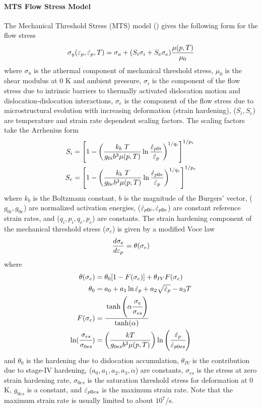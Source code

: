   \paragraph{MTS Flow Stress Model}
  The Mechanical Threshold Stress (MTS) model 
  (\cite{Follans88,Goto00a,Kocks01})  
  gives the following form for the flow stress
  \begin{equation}
    \sigma_y(\Ep,\Epdot{},T) = 
      \sigma_a + (S_i \sigma_i + S_e \sigma_e)\frac{\mu(p,T)}{\mu_0} 
  \end{equation}
  where $\sigma_a$ is the athermal component of mechanical threshold stress,
  $\mu_0$ is the shear modulus at 0 K and ambient pressure, 
  $\sigma_i$ is the component of the flow stress due to intrinsic barriers 
  to thermally activated dislocation motion and dislocation-dislocation 
  interactions, $\sigma_e$ is the component of the flow stress due to 
  microstructural evolution with increasing deformation (strain hardening), 
  ($S_i, S_e$) are temperature and strain rate dependent scaling factors.  The
  scaling factors take the Arrhenius form
  \begin{align}
    S_i & = \left[1 - \left(\frac{k_b~T}{g_{0i}b^3\mu(p,T)}
    \ln\frac{\Epdot{0i}}{\Epdot{}}\right)^{1/q_i}
    \right]^{1/p_i} \\
    S_e & = \left[1 - \left(\frac{k_b~T}{g_{0e}b^3\mu(p,T)}
    \ln\frac{\Epdot{0e}}{\Epdot{}}\right)^{1/q_e}
    \right]^{1/p_e}
  \end{align}
  where $k_b$ is the Boltzmann constant, $b$ is the magnitude of the Burgers' 
  vector, ($g_{0i}, g_{0e}$) are normalized activation energies, 
  ($\Epdot{0i}, \Epdot{0e}$) are constant reference strain rates, and
  ($q_i, p_i, q_e, p_e$) are constants.  The strain hardening component
  of the mechanical threshold stress ($\sigma_e$) is given by a
  modified Voce law
  \begin{equation}\label{eq:MTSsige}
    \frac{d\sigma_e}{d\Ep} = \theta(\sigma_e)
  \end{equation}
  where
  \begin{align}
    \theta(\sigma_e) & = 
       \theta_0 [ 1 - F(\sigma_e)] + \theta_{IV} F(\sigma_e) \\
    \theta_0 & = a_0 + a_1 \ln \Epdot{} + a_2 \sqrt{\Epdot{}} - a_3 T \\
    F(\sigma_e) & = 
      \cfrac{\tanh\left(\alpha \cfrac{\sigma_e}{\sigma_{es}}\right)}
      {\tanh(\alpha)}\\
    \ln(\cfrac{\sigma_{es}}{\sigma_{0es}}) & =
    \left(\frac{kT}{g_{0es} b^3 \mu(p,T)}\right)
    \ln\left(\cfrac{\Epdot{}}{\Epdot{0es}}\right)
  \end{align}
  and $\theta_0$ is the hardening due to dislocation accumulation, 
  $\theta_{IV}$ is the contribution due to stage-IV hardening,
  ($a_0, a_1, a_2, a_3, \alpha$) are constants,
  $\sigma_{es}$ is the stress at zero strain hardening rate, 
  $\sigma_{0es}$ is the saturation threshold stress for deformation at 0 K,
  $g_{0es}$ is a constant, and $\Epdot{0es}$ is the maximum strain rate.  Note
  that the maximum strain rate is usually limited to about $10^7$/s.

